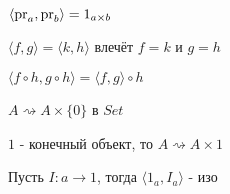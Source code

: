 \begin{task}
  $\langle \operatorname{pr}_a, \operatorname{pr}_b \rangle = 1_{a \times b}$
\end{task}

\begin{task}
  $\langle f, g \rangle = \langle k, h \rangle$ влечёт $f = k$ и $g = h$
\end{task}

\begin{task}
  $\langle f \circ h, g \circ h \rangle = \langle f, g \rangle \circ h$
\end{task}

\begin{task}
  $A \rightsquigarrow A \times \{0\}$ в $Set$
\end{task}

\begin{task}
  $1$ - конечный объект, то $A \rightsquigarrow A \times 1$
\end{task}

\begin{task}
  Пусть $I \colon a \to 1$, тогда $\langle 1_a, I_a \rangle$ - изо
\end{task}




